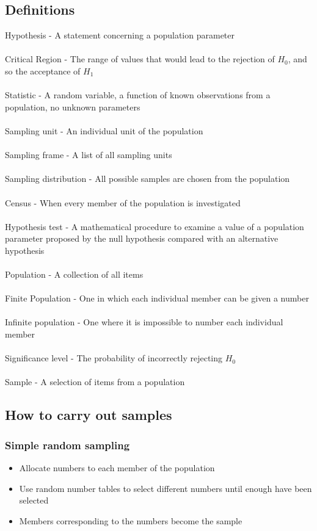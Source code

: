 \documentclass{article}[18pt]
\begin{document}
\subsection{Definitions}
Hypothesis - A statement concerning a population parameter\\ 
\\
Critical Region - The range of values that would lead to the rejection of $H_0$, and so the acceptance of $H_1$\\ 
\\
Statistic - A random variable, a function of known observations from a population, no unknown parameters\\ 
\\
Sampling unit - An individual unit of the population\\ 
\\
Sampling frame - A list of all sampling units\\ 
\\
Sampling distribution - All possible samples are chosen from the population\\ 
\\
Census - When every member of the population is investigated\\ 
\\
Hypothesis test - A mathematical procedure to examine a value of 
a population parameter proposed by the null hypothesis compared with an alternative hypothesis\\ 
\\
Population - A collection of all items\\ 
\\
Finite Population - One in which each individual member can be given a number\\ 
\\
Infinite population - One where it is impossible to number each individual member\\ 
\\
Significance level - The probability of incorrectly rejecting $H_0$\\ 
\\
Sample - A selection of items from a population\\ 


\newpage
\setcounter{subsection}{2}
\subsection{How to carry out samples}
\subsubsection{Simple random sampling}
\begin{itemize}
\item Allocate numbers to each member of the population
\item Use random number tables to select different numbers until enough have been selected
\item Members corresponding to the numbers become the sample
\end{itemize}
\end{document}
